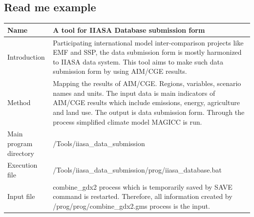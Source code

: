 \documentclass[10pt,a4paper,titlepage,dvipdfmx]{book}
\begin{document}
\begin{itemize}
\subsection{\label{subsec:ReaMeExa}Read me example}


\begin{tabularx}{\textwidth}{|
p{}|
p{}|} 
\caption{\label{tab:ReaExaIAMC}readme example for IAMC database template} \\
\hline 
Name & A tool for IIASA Database submission form  \\\hline 
Introduction & Participating international model inter-comparison projects like EMF and SSP, the data submission form is mostly harmonized to IIASA data system. This tool aims to make such data submission form by using AIM/CGE results. \\\hline 
Method & Mapping the results of AIM/CGE. Regions, variables, scenario names and units. The input data is main indicators of AIM/CGE results which include emissions, energy, agriculture and land use. The output is data submission form. Through the process simplified climate model MAGICC is run. \\\hline 
Main program directory & /Tools/iiasa\_data\_submission \\\hline 
Execution file & /Tools/iiasa\_data\_submission/prog/iiasa\_database.bat \\\hline 
Input file & combine\_gdx2 process which is temporarily saved by SAVE command is restarted. Therefore, all information created by /prog/prog/combine\_gdx2.gms process is the input. \\\hline 
\end{tabularx}


\end{itemize}
\end{document}
